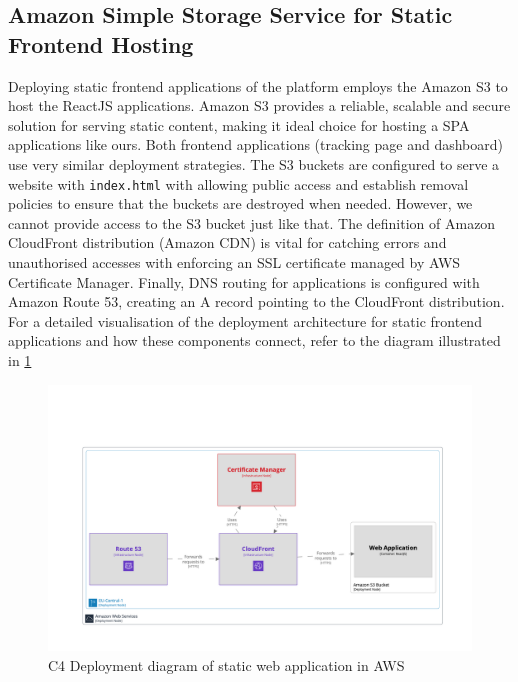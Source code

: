 \subsection{Amazon Simple Storage Service for Static Frontend Hosting}
\label{subsec:amazon-s3-static-frontend}
Deploying static frontend applications of the platform employs the Amazon \ac{S3} to host the ReactJS applications. Amazon \ac{S3} provides a reliable, scalable and secure solution for serving static content, making it ideal choice for hosting a \ac{SPA} applications like ours.
Both frontend applications (tracking page and dashboard) use very similar deployment strategies.
The \ac{S3} buckets are configured to serve a website with \texttt{index.html} with allowing public access and establish removal policies to ensure that the buckets are destroyed when needed. 
However, we cannot provide access to the S3 bucket just like that.
The definition of Amazon CloudFront distribution (Amazon \ac{CDN}) is vital for catching errors and unauthorised accesses with enforcing an SSL certificate managed by \ac{AWS} Certificate Manager.
Finally, DNS routing for applications is configured with Amazon Route 53, creating an A record pointing to the CloudFront distribution.
For a detailed visualisation of the deployment architecture for static frontend applications and how these components connect, refer to the diagram illustrated in \ref{img06:fig_static-webapp} 


\begin{figure}[p]\centering
\includegraphics[width=140mm]{img/chap06/fig_static-webapp.png}
\caption{C4 Deployment diagram of static web application in AWS}
\label{img06:fig_static-webapp}
\end{figure}

